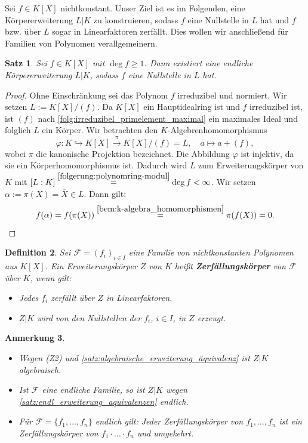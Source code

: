 \documentclass[a4paper, twoside, 11pt, ngerman]{report}
\newcommand{\calF}{\mathcal F}
\theoremstyle{definistyle}
\newtheorem{satz}{Satz}[section]
\newtheorem{defini}[satz]{Definition}
\newtheorem{anm}[satz]{Anmerkung}
\theoremstyle{remark}
\newcommand{\defn}[1]{\textit{\bfseries #1}}
\begin{document}
Sei $f \in K[X]$ nichtkonstant. Unser Ziel ist es im Folgenden, eine Körpererweiterung $L|K$ zu konstruieren, sodass $f$ eine Nullstelle in $L$ hat und $f$ bzw. über $L$ sogar in Linearfaktoren zerfällt. Dies wollen wir anschließend für Familien von Polynomen verallgemeinern.

\begin{satz}\label{satz:zerfall_poly}
Sei $f \in K[X]$ mit $\deg f \geq 1$. Dann existiert eine endliche Körpererweiterung $L|K$, sodass $f$ eine Nullstelle in $L$ hat.
\end{satz}

\begin{proof}
Ohne Einschränkung sei das Polynom $f$ irreduzibel und normiert. Wir setzen
$L:=K[X]/(f)$. Da $K[X]$ ein Hauptidealring ist und $f$ irreduzibel ist,  ist $(f)$ nach \ref{folg:irreduzibel_primelement_maximal} ein maximales Ideal und folglich $L$ ein Körper.
Wir betrachten den $K$-Algebrenhomomorphismus 
\[
\varphi \colon K\hookrightarrow K[X] \overset{\pi}{\to} K[X]/(f)=L, \quad a \mapsto a + (f),
\]
wobei $\pi$ die kanonische Projektion bezeichnet. Die Abbildung $\varphi$ ist injektiv, da sie ein Körperhomomorphismus ist. Dadurch wird $L$ zum Erweiterungskörper von $K$
mit $[L:K]\overset{\ref{folgerung:polynomring-modul}}{=}\deg f<\infty$. 
Wir setzen $\alpha := \pi(X) = \overline{X}\in L$. Dann gilt:
\[
f(\alpha) = f(\pi(X)) \overset{\ref{bem:k-algebra_homomorphismen}}{=} \pi(f(X)) = 0.
\]
\end{proof}

\begin{defini}\label{def:zerfall_koerper}
Sei $\calF = (f_i)_{i \in I}$ eine Familie von nichtkonstanten Polynomen aus $K[X]$. Ein Erweiterungskörper $Z$ von $K$ heißt \defn{Zerfällungskörper} von $\calF$ über $K$, wenn gilt:
\begin{itemize}
    \item[(Z1)] Jedes $f_i$ zerfällt über $Z$ in Linearfaktoren.
    \item[(Z2)] $Z|K$ wird von den Nullstellen der $f_i$, $i \in I$, in $Z$ erzeugt.
\end{itemize}
\end{defini}

\begin{anm}\label{anm:zerfkp_produkt}
\begin{itemize}
\item Wegen (Z2) und \ref{satz:algebraische_erweiterung_äquivalenz} ist $Z|K$ algebraisch. 
\item Ist $\calF$ eine endliche Familie, so ist $Z|K$ wegen \ref{satz:endl_erweiterung_aquivalenzen} endlich. 
\item Für $\calF = \{f_1, \dots, f_n\}$ endlich gilt: Jeder Zerfällungskörper von $f_1, \dots, f_n$ ist ein Zerfällungskörper von $f_1\cdot\ldots\cdot f_n$ und umgekehrt.
\end{itemize}
\end{anm}
\end{document}
